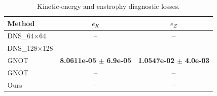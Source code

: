 \begin{table}[t]
\centering
\caption{Kinetic-energy and enstrophy diagnostic losses.}
\label{tab:ke_enstrophy_losses}
\begin{tabular}{lcc}
\toprule
Method & $e_K$ & $e_Z$ \\
\midrule
DNS\_64$\times$64 & -- & -- \\
DNS\_128$\times$128 & -- & -- \\
GNOT & \textbf{8.0611e-05 $\pm$ 6.9e-05} & \textbf{1.0547e-02 $\pm$ 4.0e-03} \\
GNOT & -- & -- \\
Ours & -- & -- \\
\bottomrule
\end{tabular}
\end{table}